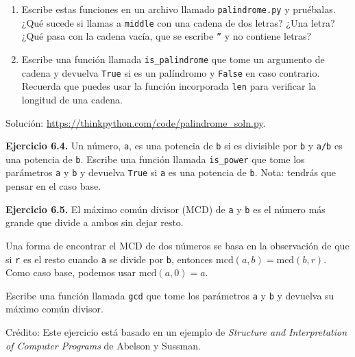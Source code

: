 \begin{enumerate}
    \item Escribe estas funciones en un archivo llamado \texttt{palindrome.py} y pruébalas. ¿Qué sucede si llamas a \texttt{middle} con una cadena de dos letras? ¿Una letra? ¿Qué pasa con la cadena vacía, que se escribe \texttt{''} y no contiene letras?
    \item Escribe una función llamada \texttt{is\_palindrome} que tome un argumento de cadena y devuelva \texttt{True} si es un palíndromo y \texttt{False} en caso contrario. Recuerda que puedes usar la función incorporada \texttt{len} para verificar la longitud de una cadena.
\end{enumerate}

Solución: \url{https://thinkpython.com/code/palindrome_soln.py}.

\textbf{Ejercicio 6.4.} Un número, \texttt{a}, es una potencia de \texttt{b} si es divisible por \texttt{b} y \texttt{a/b} es una potencia de \texttt{b}. Escribe una función llamada \texttt{is\_power} que tome los parámetros \texttt{a} y \texttt{b} y devuelva \texttt{True} si \texttt{a} es una potencia de \texttt{b}. Nota: tendrás que pensar en el caso base.

\textbf{Ejercicio 6.5.} El máximo común divisor (MCD) de \texttt{a} y \texttt{b} es el número más grande que divide a ambos sin dejar resto.

Una forma de encontrar el MCD de dos números se basa en la observación de que si \texttt{r} es el resto cuando \texttt{a} se divide por \texttt{b}, entonces $\text{mcd}(a,b) = \text{mcd}(b,r)$. Como caso base, podemos usar $\text{mcd}(a,0) = a$.

Escribe una función llamada \texttt{gcd} que tome los parámetros \texttt{a} y \texttt{b} y devuelva su máximo común divisor.

Crédito: Este ejercicio está basado en un ejemplo de \textit{Structure and Interpretation of Computer Programs} de Abelson y Sussman.